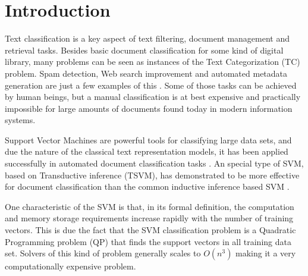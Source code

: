 \section{Introduction}

Text classification is a key aspect of text filtering, document management
and retrieval tasks. Besides basic document classification for some
kind of digital library, many problems can be seen as instances of
the Text Categorization (TC) problem. Spam detection, Web search
improvement and automated metadata generation are just a few examples
of this \cite{Sebastiani02}.  Some of those tasks can be achieved
by human beings, but a manual classification is at best expensive
and practically impossible for large amounts of documents found today
in modern information systems.


Support Vector Machines \cite{Vapnik98} are powerful tools for classifying
large data sets, and due the nature of the classical text representation
models, it has been applied successfully in automated document classification
tasks \cite{Joachims98,Joachims99c}. An special type of SVM, based
on Transductive inference (TSVM), has demonstrated to be more effective
for document classification than the common inductive inference based
SVM \cite{Joachims99c}.

One characteristic of the SVM is that, in its formal definition, the
computation and memory storage requirements increase rapidly with
the number of training vectors. This is due the fact that the SVM
classification problem is a Quadratic Programming problem (QP) that
finds the support vectors in all training data set. Solvers of this
kind of problem generally scales to $O(n^{3})$ making it a very computationally
expensive problem.



